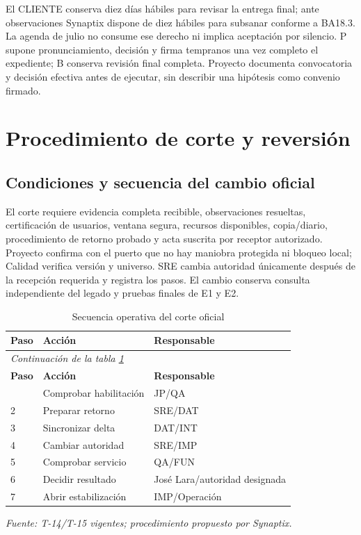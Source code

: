 El CLIENTE conserva diez días hábiles para revisar la entrega final; ante observaciones Synaptix dispone de diez hábiles para subsanar conforme a BA18.3. La agenda de julio no consume ese derecho ni implica aceptación por silencio. P supone pronunciamiento, decisión y firma tempranos una vez completo el expediente; B conserva revisión final completa. Proyecto documenta convocatoria y decisión efectiva antes de ejecutar, sin describir una hipótesis como convenio firmado.

\section{Procedimiento de corte y reversión}\label{sec:t18-corte}
\subsection{Condiciones y secuencia del cambio oficial}
El corte requiere evidencia completa recibible, observaciones resueltas, certificación de usuarios, ventana segura, recursos disponibles, copia/diario, procedimiento de retorno probado y acta suscrita por receptor autorizado. Proyecto confirma con el puerto que no hay maniobra protegida ni bloqueo local; Calidad verifica versión y universo. SRE cambia autoridad únicamente después de la recepción requerida y registra los pasos. El cambio conserva consulta independiente del legado y pruebas finales de E1 y E2.

\begingroup\small\setlength{\tabcolsep}{3pt}
\begin{longtable}{p{}p{}p{}}
\caption{Secuencia operativa del corte oficial}\label{tab:t18-corte}\\\hline
\textbf{Paso} & \textbf{Acción} & \textbf{Responsable}\\\hline\endfirsthead
\multicolumn{3}{l}{\textit{Continuación de la tabla \ref{tab:t18-corte}}}\\\hline
\textbf{Paso} & \textbf{Acción} & \textbf{Responsable}\\\hline\endhead
\hline\endfoot\hline\endlastfoot
1 & Comprobar habilitación & JP/QA\\\hline
2 & Preparar retorno & SRE/DAT\\\hline
3 & Sincronizar delta & DAT/INT\\\hline
4 & Cambiar autoridad & SRE/IMP\\\hline
5 & Comprobar servicio & QA/FUN\\\hline
6 & Decidir resultado & José Lara/autoridad designada\\\hline
7 & Abrir estabilización & IMP/Operación\\\hline
\end{longtable}\endgroup
\noindent\textit{Fuente: T-14/T-15 vigentes; procedimiento propuesto por Synaptix.}

